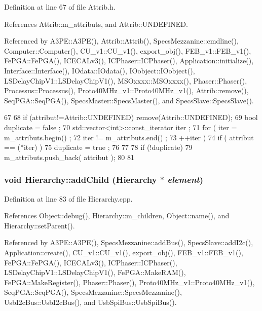 Definition at line 67 of file Attrib.h.

References Attrib::m\_\-attributs, and Attrib::UNDEFINED.

Referenced by A3PE::A3PE(), Attrib::Attrib(), SpecsMezzanine::cmdline(), Computer::Computer(), CU\_\-v1::CU\_\-v1(), export\_\-obj(), FEB\_\-v1::FEB\_\-v1(), FePGA::FePGA(), ICECALv3(), ICPhaser::ICPhaser(), Application::initialize(), Interface::Interface(), IOdata::IOdata(), IOobject::IOobject(), LSDelayChipV1::LSDelayChipV1(), MSOxxxx::MSOxxxx(), Phaser::Phaser(), Processus::Processus(), Proto40MHz\_\-v1::Proto40MHz\_\-v1(), Attrib::remove(), SeqPGA::SeqPGA(), SpecsMaster::SpecsMaster(), and SpecsSlave::SpecsSlave().


\begin{DoxyCode}
67                             {
68     if (attribut!=Attrib::UNDEFINED) remove(Attrib::UNDEFINED);
69     bool duplicate = false ;
70     std::vector<int>::const_iterator iter ;
71     for ( iter  = m_attributs.begin() ;
72           iter != m_attributs.end()   ;
73           ++iter ) {
74       if ( attribut == (*iter) ) {
75         duplicate = true ;
76       }
77     }
78     if (!duplicate) {
79       m_attributs.push_back( attribut );
80     }
81   }
\end{DoxyCode}
\hypertarget{classHierarchy_ad677774ff38fcb257c04a3a10d471fac}{
\subsubsection[{addChild}]{\setlength{\rightskip}{0pt plus 5cm}void Hierarchy::addChild ({\bf Hierarchy} $\ast$ {\em element})}}
\label{classHierarchy_ad677774ff38fcb257c04a3a10d471fac}


Definition at line 83 of file Hierarchy.cpp.

References Object::debug(), Hierarchy::m\_\-children, Object::name(), and Hierarchy::setParent().

Referenced by A3PE::A3PE(), SpecsMezzanine::addBus(), SpecsSlave::addI2c(), Application::create(), CU\_\-v1::CU\_\-v1(), export\_\-obj(), FEB\_\-v1::FEB\_\-v1(), FePGA::FePGA(), ICECALv3(), ICPhaser::ICPhaser(), LSDelayChipV1::LSDelayChipV1(), FePGA::MakeRAM(), FePGA::MakeRegister(), Phaser::Phaser(), Proto40MHz\_\-v1::Proto40MHz\_\-v1(), SeqPGA::SeqPGA(), SpecsMezzanine::SpecsMezzanine(), UsbI2cBus::UsbI2cBus(), and UsbSpiBus::UsbSpiBus().


